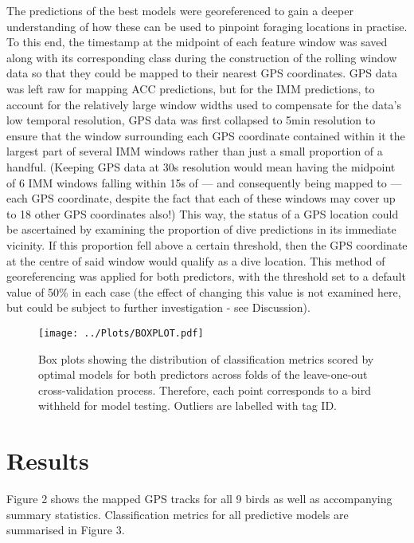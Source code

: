 \documentclass[11pt]{article}
\begin{document}
    The predictions of the best models were georeferenced to gain a deeper understanding of how these can be used to pinpoint foraging locations in practise. To this end, the timestamp at the midpoint of each feature window was saved along with its corresponding class during the construction of the rolling window data so that they could be mapped to their nearest GPS coordinates. GPS data was left raw for mapping ACC predictions, but for the IMM predictions, to account for the relatively large window widths used to compensate for the data's low temporal resolution, GPS data was first collapsed to 5min resolution to ensure that the window surrounding each GPS coordinate contained within it the largest part of several IMM windows rather than just a small proportion of a handful. (Keeping GPS data at 30s resolution would mean having the midpoint of 6 IMM windows falling within 15s of — and consequently being mapped to — each GPS coordinate, despite the fact that each of these windows may cover up to 18 other GPS coordinates also!) This way, the status of a GPS location could be ascertained by examining the proportion of dive predictions in its immediate vicinity. If this proportion fell above a certain threshold, then the GPS coordinate at the centre of said window would qualify as a dive location. This method of georeferencing was applied for both predictors, with the threshold set to a default value of 50\% in each case (the effect of changing this value is not examined here, but could be subject to further investigation - see Discussion). 
    
    
    \begin{figure}[b!]
	    \centering\texttt{[image: ../Plots/BOXPLOT.pdf]}
	    \caption{Box plots showing the distribution of classification metrics scored by optimal models for both predictors across folds of the leave-one-out cross-validation process. Therefore, each point corresponds to a bird withheld for model testing. Outliers are labelled with tag ID.}
    \end{figure}
    
    \section{Results}
    Figure 2 shows the mapped GPS tracks for all 9 birds as well as accompanying summary statistics. Classification metrics for all predictive models are summarised in Figure 3. 
    
\end{document}
